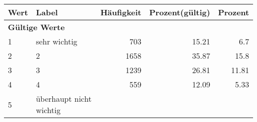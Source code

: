      \begin{longtable}{lXrrr}
     \toprule
     \textbf{Wert} & \textbf{Label} & \textbf{Häufigkeit} & \textbf{Prozent(gültig)} & \textbf{Prozent} \\
     \endhead
     \midrule
     \multicolumn{5}{l}{\textbf{Gültige Werte}}\\

     1 &
     \multicolumn{1}{X}{ sehr wichtig   } &


       \num{703} &
       \num[round-mode=places,round-precision=2]{15.21} &
         \num[round-mode=places,round-precision=2]{6.7} \\

     2 &
     \multicolumn{1}{X}{ 2   } &


       \num{1658} &
       \num[round-mode=places,round-precision=2]{35.87} &
         \num[round-mode=places,round-precision=2]{15.8} \\

     3 &
     \multicolumn{1}{X}{ 3   } &


       \num{1239} &
       \num[round-mode=places,round-precision=2]{26.81} &
         \num[round-mode=places,round-precision=2]{11.81} \\

     4 &
     \multicolumn{1}{X}{ 4   } &


       \num{559} &
       \num[round-mode=places,round-precision=2]{12.09} &
         \num[round-mode=places,round-precision=2]{5.33} \\

     5 &
     \multicolumn{1}{X}{ überhaupt nicht wichtig   } &



\end{longtable}
